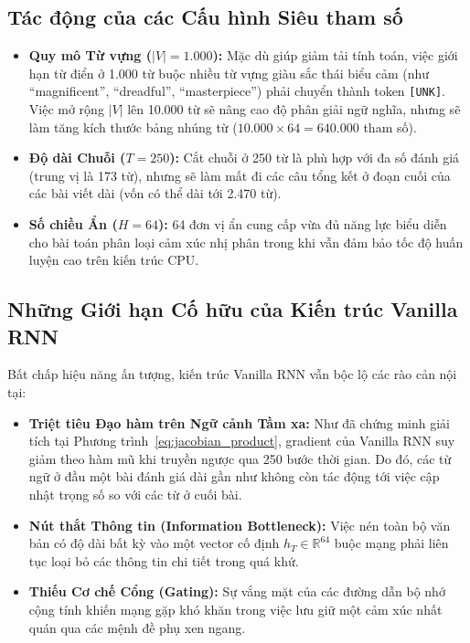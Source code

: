\documentclass[11pt,a4paper]{article}
\begin{document}
\subsection{Tác động của các Cấu hình Siêu tham số}
\begin{itemize}
    \item \textbf{Quy mô Từ vựng ($|V| = 1.000$):} Mặc dù giúp giảm tải tính toán, việc giới hạn từ điển ở 1.000 từ buộc nhiều từ vựng giàu sắc thái biểu cảm (như ``magnificent'', ``dreadful'', ``masterpiece'') phải chuyển thành token \texttt{[UNK]}. Việc mở rộng $|V|$ lên 10.000 từ sẽ nâng cao độ phân giải ngữ nghĩa, nhưng sẽ làm tăng kích thước bảng nhúng từ ($10.000 \times 64 = 640.000$ tham số).
    \item \textbf{Độ dài Chuỗi ($T = 250$):} Cắt chuỗi ở 250 từ là phù hợp với đa số đánh giá (trung vị là 173 từ), nhưng sẽ làm mất đi các câu tổng kết ở đoạn cuối của các bài viết dài (vốn có thể dài tới 2.470 từ).
    \item \textbf{Số chiều Ẩn ($H = 64$):} 64 đơn vị ẩn cung cấp vừa đủ năng lực biểu diễn cho bài toán phân loại cảm xúc nhị phân trong khi vẫn đảm bảo tốc độ huấn luyện cao trên kiến trúc CPU.
\end{itemize}

\subsection{Những Giới hạn Cố hữu của Kiến trúc Vanilla RNN}
Bất chấp hiệu năng ấn tượng, kiến trúc Vanilla RNN vẫn bộc lộ các rào cản nội tại:
\begin{itemize}
    \item \textbf{Triệt tiêu Đạo hàm trên Ngữ cảnh Tầm xa:} Như đã chứng minh giải tích tại Phương trình~\ref{eq:jacobian_product}, gradient của Vanilla RNN suy giảm theo hàm mũ khi truyền ngược qua 250 bước thời gian. Do đó, các từ ngữ ở đầu một bài đánh giá dài gần như không còn tác động tới việc cập nhật trọng số so với các từ ở cuối bài.
    \item \textbf{Nút thắt Thông tin (Information Bottleneck):} Việc nén toàn bộ văn bản có độ dài bất kỳ vào một vector cố định $h_T \in \mathbb{R}^{64}$ buộc mạng phải liên tục loại bỏ các thông tin chi tiết trong quá khứ.
    \item \textbf{Thiếu Cơ chế Cổng (Gating):} Sự vắng mặt của các đường dẫn bộ nhớ cộng tính khiến mạng gặp khó khăn trong việc lưu giữ một cảm xúc nhất quán qua các mệnh đề phụ xen ngang.
\end{itemize}
\end{document}
